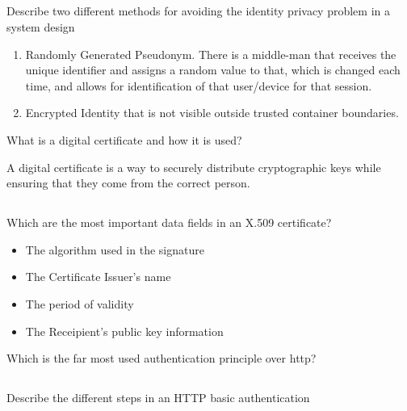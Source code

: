 \begin{questions}
  \begin{parts}
  \part{} Describe two different methods for avoiding the identity privacy problem in a system design
    \begin{solution}
      \begin{enumerate}[noitemsep]
      \item Randomly Generated Pseudonym.
        There is a middle-man that receives the unique identifier and assigns a random value to that, which is changed each time, and allows for identification of that user/device for that session.
      \item Encrypted Identity that is not visible outside trusted container boundaries.
      \end{enumerate}
    \end{solution}
  \end{parts}

\question{} What is a digital certificate and how it is used?
  \begin{solution}
    A digital certificate is a way to securely distribute cryptographic keys while ensuring that they come from the correct person.
  \end{solution}

  \begin{parts}
  \part{} Which are the most important data fields in an X.509 certificate?
    \begin{solution}
      \begin{itemize}[noitemsep]
      \item The algorithm used in the signature
      \item The Certificate Issuer's name
      \item The period of validity
      \item The Receipient's public key information
      \end{itemize}
    \end{solution}
  \end{parts}

\question{} Which is the far most used authentication principle over http?
  \begin{parts}
  \part{} Describe the different steps in an HTTP basic authentication

\end{parts}
\end{questions}
